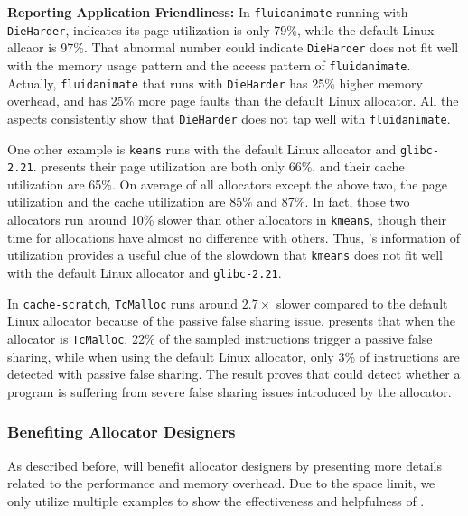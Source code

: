 \textbf{Reporting Application Friendliness:} 
In \texttt{fluidanimate} running with \texttt{DieHarder}, \MP{} indicates its page utilization is only 79\%, while the default Linux allcaor is 97\%. That abnormal number could indicate \texttt{DieHarder} does not fit well with the memory usage pattern and the access pattern of \texttt{fluidanimate}. Actually, \texttt{fluidanimate} that runs with \texttt{DieHarder} has 25\% higher memory overhead, and has 25\% more page faults than the default Linux allocator. All the aspects consistently show that \texttt{DieHarder} does not tap well with \texttt{fluidanimate}.

One other example is \texttt{keans} runs with the default Linux allocator and \texttt{glibc-2.21}. \MP{} presents their page utilization are both only 66\%, and their cache utilization are 65\%. On average of all allocators except the above two, the page utilization and the cache utilization are 85\% and 87\%. In fact, those two allocators run around 10\% slower than other allocators in \texttt{kmeans}, though their time for allocations have almost no difference with others. Thus, \MP{}'s information of utilization provides a useful clue of the slowdown that \texttt{kmeans} does not fit well with the default Linux allocator and \texttt{glibc-2.21}.

In \texttt{cache-scratch}, \texttt{TcMalloc} runs around $2.7\times$ slower compared to the default Linux allocator because of the passive false sharing issue.
\MP{} presents that when the allocator is \texttt{TcMalloc}, 22\% of the sampled instructions trigger a passive false sharing, while when using the default Linux allocator, only 3\% of instructions are detected with passive false sharing.
The result proves that \MP{} could detect whether a program is suffering from severe false sharing issues introduced by the allocator.

\subsubsection{Benefiting Allocator Designers}
\label{sec: benifitdesigners}
As described before, \MP{} will benefit allocator designers by presenting more details related to the performance and memory overhead. Due to the space limit, we only utilize multiple examples to show the effectiveness and helpfulness of \MP{}. 




